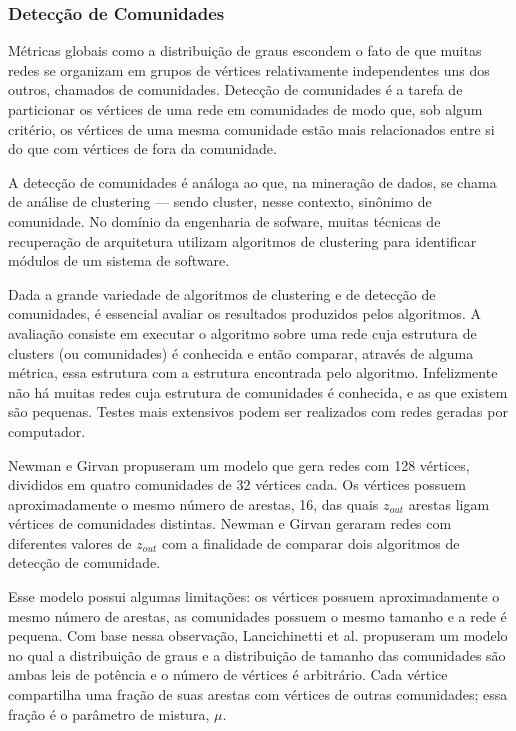 \documentclass{article}
\begin{document}

\subsubsection{Detecção de Comunidades}

Métricas globais como a distribuição de graus escondem o fato de que muitas redes se organizam em grupos de vértices relativamente independentes uns dos outros, chamados de comunidades. Detecção de comunidades é a tarefa de particionar os vértices de uma rede em comunidades de modo que, sob algum critério, os vértices de uma mesma comunidade estão mais relacionados entre si do que com vértices de fora da comunidade.

A detecção de comunidades é análoga ao que, na mineração de dados, se chama de análise de clustering --- sendo cluster, nesse contexto, sinônimo de comunidade. No domínio da engenharia de sofware, muitas técnicas de recuperação de arquitetura utilizam algoritmos de clustering para identificar módulos de um sistema de software.

Dada a grande variedade de algoritmos de clustering e de detecção de comunidades, é essencial avaliar os resultados produzidos pelos algoritmos. A avaliação consiste em executar o algoritmo sobre uma rede cuja estrutura de clusters (ou comunidades) é conhecida e então comparar, através de alguma métrica, essa estrutura com a estrutura encontrada pelo algoritmo. Infelizmente não há muitas redes cuja estrutura de comunidades é conhecida, e as que existem são pequenas. Testes mais extensivos podem ser realizados com redes geradas por computador.

Newman e Girvan \cite{Newman2004a} propuseram um modelo que gera redes com 128 vértices, divididos em quatro comunidades de 32 vértices cada. Os vértices possuem aproximadamente o mesmo número de arestas, 16, das quais $z_{out}$ arestas ligam vértices de comunidades distintas. Newman e Girvan geraram redes com diferentes valores de $z_{out}$ com a finalidade de comparar dois algoritmos de detecção de comunidade.

Esse modelo possui algumas limitações: os vértices possuem aproximadamente o mesmo número de arestas, as comunidades possuem o mesmo tamanho e a rede é pequena. Com base nessa observação, Lancichinetti et al. \cite{Lancichinetti2008} propuseram um modelo no qual a distribuição de graus e a distribuição de tamanho das comunidades são ambas leis de potência e o número de vértices é arbitrário. Cada vértice compartilha uma fração de suas arestas com vértices de outras comunidades; essa fração é o parâmetro de mistura, $\mu$.
\end{document}
